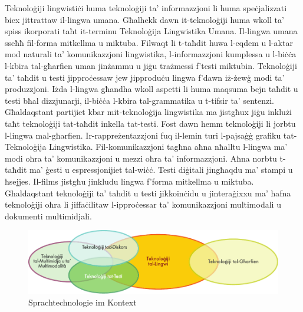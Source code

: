 \documentclass[]{../../metanetpaper}
\begin{document}
\begin{multicols}{2}

Teknoloġiji lingwistiċi huma teknoloġiji ta’ informazzjoni li huma speċjalizzati biex jittrattaw il-lingwa umana. Għalhekk dawn it-teknoloġiji huma wkoll ta’ spiss ikorporati taħt it-terminu Teknoloġija Lingwistika Umana. Il-lingwa umana sseħħ fil-forma mitkellma u miktuba. Filwaqt li t-taħdit huwa l-eqdem u l-aktar mod naturali ta’ komunikazzjoni lingwistika, l-informazzjoni kumplessa u l-biċċa l-kbira tal-għarfien uman jinżammu u jiġu trażmessi f’testi miktubin. Teknoloġiji ta’ taħdit u testi jipproċessaw jew jipproduċu lingwa f'dawn iż-żewġ modi ta’ produzzjoni. Iżda l-lingwa għandha wkoll aspetti li huma maqsuma bejn taħdit u testi bħal dizzjunarji, il-biċċa l-kbira tal-grammatika u t-tifsir ta’ sentenzi. Għaldaqstant partijiet kbar mit-teknoloġija lingwistika ma jistgħux jiġu inklużi taħt teknoloġiji tat-taħdit inkella tat-testi. Fost dawn hemm teknoloġiji li jorbtu l-lingwa mal-għarfien. Ir-rappreżentazzjoni fuq il-lemin turi l-pajsaġġ grafiku tat-Teknoloġija Lingwistika. Fil-komunikazzjoni tagħna aħna nħalltu l-lingwa ma’ modi oħra ta’ komunikazzjoni u mezzi oħra ta’ informazzjoni. Aħna norbtu t-taħdit ma’ ġesti u espressjonijiet tal-wiċċ. Testi diġitali jingħaqdu ma’ stampi u ħsejjes. Il-films jistgħu jinkludu lingwa f’forma mitkellma u miktuba. Għaldaqstant teknoloġiji ta’ taħdit u testi jikkoinċidu u jinteraġixxu ma’ ħafna teknoloġiji oħra li jiffaċilitaw l-ipproċessar ta’ komunikazzjoni multimodali u dokumenti multimidjali.

 \begin{figure}[htb]
  \center
  \includegraphics[width=\textwidth]{../_media/maltese/language_technologies}
  \caption{Sprachtechnologie im Kontext}
  \label{fig:ltincontext_de}
\end{figure}



\end{multicols}
\end{document}
